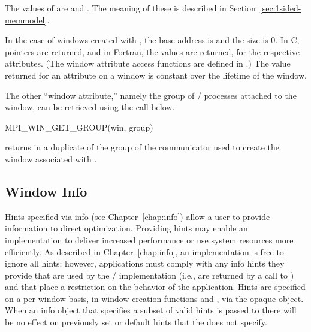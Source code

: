 The values of  are 
and .  The meaning of these is described in
Section~\ref{sec:1sided-memmodel}.

In the case of windows created with
, the base address is
 and the size is $0$. In C, pointers 
are returned, and in Fortran, the
values are returned, for the respective attributes.
(The window attribute access functions are defined in
.)
The value returned for an attribute on a window is constant
over the lifetime of the window. 

The other ``window attribute,'' namely the group of \mpi/ processes attached
to the window, can be retrieved using the call below.

%
%
\begin{funcdef}{MPI\_WIN\_GET\_GROUP}{(\mbox{win}, \mbox{group})}
\end{funcdef}

 returns in 
a duplicate of the group
of the communicator used to create the window
associated with .

\subsection{Window Info}
\label{subsec:window-info}

Hints specified via info
(see Chapter~\ref{chap:info})
allow a user to provide information
to direct optimization.
Providing hints may enable an implementation to deliver increased
performance or use system resources more efficiently.
As described in Chapter~\ref{chap:info},
an implementation is free to ignore all hints; however, applications
must comply with any info hints they provide that are used by the \MPI/
implementation (i.e., are returned by a call to
) and that place a restriction on the
behavior of the application.
Hints are specified on a per window basis,
in window creation functions and ,
via the opaque  object.
When an info object that specifies a subset of valid hints is passed to
there will be no effect on
previously set or default hints that the  does not specify. 

